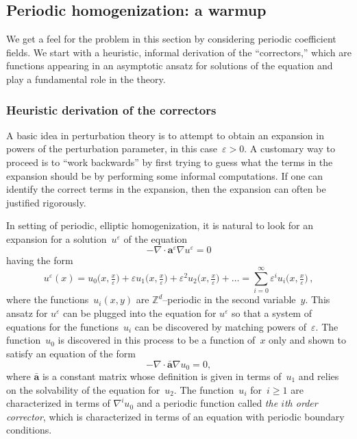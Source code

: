 \documentclass[11pt]{article} %
\numberwithin{equation}{section}
\theoremstyle{definition}
\newcommand*{\Zd}{\ensuremath{\mathbb{Z}^d}}
\newcommand{\eps}{\varepsilon}
\newcommand{\ep}{\eps}
\renewcommand{\a}{\mathbf{a}}
\newcommand{\ahom}{\bar{\a}}
\begin{document}
\subsection{Periodic homogenization: a warmup}
\label{s.periodic}

We get a feel for the problem in this section by considering periodic coefficient fields. We start with a heuristic, informal derivation of the ``correctors,'' which are functions appearing in an asymptotic ansatz for solutions of the equation and play a fundamental role in the theory. 


\subsubsection{Heuristic derivation of the correctors}

A basic idea in perturbation theory is to attempt to obtain an expansion in powers of the perturbation parameter, in this case~$\ep>0$. A customary way to proceed is to ``work backwards'' by first trying to guess what the terms in the expansion should be by performing some informal computations. If one can identify the correct terms in the expansion, then the expansion can often be justified rigorously. 

In setting of periodic, elliptic homogenization, it is natural to look for an expansion for a solution~$u^\ep$ of the equation
\begin{equation}
\label{e.pde}
-\nabla \cdot \a^\ep \nabla u^\ep = 0
\end{equation}
having the form 
\begin{equation}
\label{e.ansatz}
u^\ep(x) 
= u_0\bigl(x,\tfrac x\ep\bigr) + \ep u_1\bigl(x,\tfrac x\ep \bigr) + \ep^2 u_2 \bigl(x,\tfrac x\ep \bigr) + \ldots 
= \sum_{i=0}^\infty \ep^i u_i\bigl(x,\tfrac x\ep \bigr)\,,
\end{equation}
where the functions~$u_i(x,y)$ are $\Zd$--periodic in the second variable~$y$.
This ansatz for $u^\ep$ can be plugged into the equation for $u^\ep$ so that a system of equations for the functions~$u_i$ can be discovered by matching powers of~$\ep$. The function~$u_0$ is discovered in this process to be a function of~$x$ only and shown to satisfy an equation of the form
\begin{equation}
-\nabla \cdot \ahom\nabla u_0 = 0,
\end{equation}
where $\ahom$ is a constant matrix whose definition is given in terms of~$u_1$ and relies on the solvability of the equation for~$u_2$. The function~$u_i$ for~$i\geq 1$ are characterized in terms of $\nabla^i u_0$ and a periodic function called \emph{the $i$th order corrector}, which is characterized in terms of an equation with periodic boundary conditions. 
\end{document}
